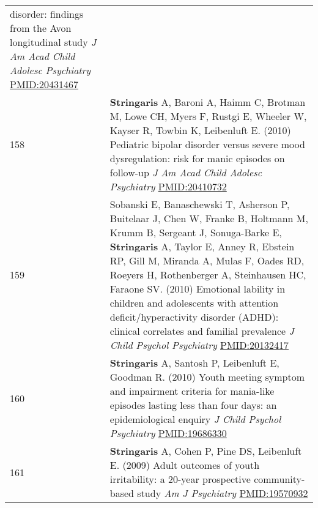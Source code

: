\documentclass[
]{article}
\begin{document}
\begin{longtable}[]{@{}ll@{}}
\begin{minipage}[t]{0.94\columnwidth}
disorder: findings from the Avon longitudinal study \emph{J Am Acad
Child Adolesc Psychiatry} \url{PMID:20431467}\strut
\end{minipage}\tabularnewline
\begin{minipage}[t]{0.01\columnwidth}\raggedright
158\strut
\end{minipage} & \begin{minipage}[t]{0.94\columnwidth}\raggedright
\textbf{Stringaris} A, Baroni A, Haimm C, Brotman M, Lowe CH, Myers F,
Rustgi E, Wheeler W, Kayser R, Towbin K, Leibenluft E. (2010) Pediatric
bipolar disorder versus severe mood dysregulation: risk for manic
episodes on follow-up \emph{J Am Acad Child Adolesc Psychiatry}
\url{PMID:20410732}\strut
\end{minipage}\tabularnewline
\begin{minipage}[t]{0.01\columnwidth}\raggedright
159\strut
\end{minipage} & \begin{minipage}[t]{0.94\columnwidth}\raggedright
Sobanski E, Banaschewski T, Asherson P, Buitelaar J, Chen W, Franke B,
Holtmann M, Krumm B, Sergeant J, Sonuga-Barke E, \textbf{Stringaris} A,
Taylor E, Anney R, Ebstein RP, Gill M, Miranda A, Mulas F, Oades RD,
Roeyers H, Rothenberger A, Steinhausen HC, Faraone SV. (2010) Emotional
lability in children and adolescents with attention
deficit/hyperactivity disorder (ADHD): clinical correlates and familial
prevalence \emph{J Child Psychol Psychiatry} \url{PMID:20132417}\strut
\end{minipage}\tabularnewline
\begin{minipage}[t]{0.01\columnwidth}\raggedright
160\strut
\end{minipage} & \begin{minipage}[t]{0.94\columnwidth}\raggedright
\textbf{Stringaris} A, Santosh P, Leibenluft E, Goodman R. (2010) Youth
meeting symptom and impairment criteria for mania-like episodes lasting
less than four days: an epidemiological enquiry \emph{J Child Psychol
Psychiatry} \url{PMID:19686330}\strut
\end{minipage}\tabularnewline
\begin{minipage}[t]{0.01\columnwidth}\raggedright
161\strut
\end{minipage} & \begin{minipage}[t]{0.94\columnwidth}\raggedright
\textbf{Stringaris} A, Cohen P, Pine DS, Leibenluft E. (2009) Adult
outcomes of youth irritability: a 20-year prospective community-based
study \emph{Am J Psychiatry} \url{PMID:19570932}\strut

\end{minipage}
\end{longtable}
\end{document}
